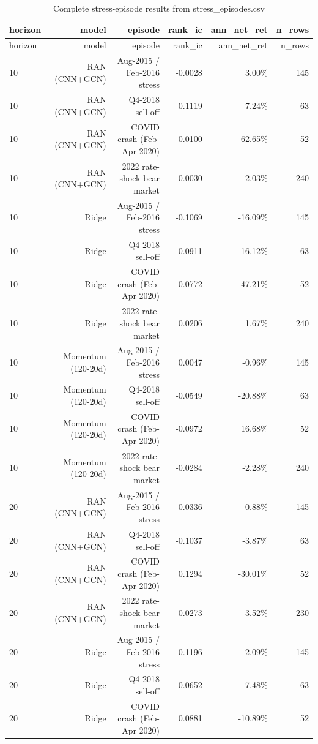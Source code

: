 \documentclass[10pt]{article}
\begin{document}
\begingroup\scriptsize\setlength{\tabcolsep}{3pt}
\begin{longtable}{lrrrrr}
\caption{Complete stress-episode results from stress\_episodes.csv}\label{tab:stressall}\\
\toprule
horizon & model & episode & rank\_ic & ann\_net\_ret & n\_rows \\
\midrule
\endfirsthead
\toprule
horizon & model & episode & rank\_ic & ann\_net\_ret & n\_rows \\
\midrule
\endhead
10 & RAN (CNN+GCN) & Aug-2015 / Feb-2016 stress & -0.0028 & 3.00\% & 145 \\
10 & RAN (CNN+GCN) & Q4-2018 sell-off & -0.1119 & -7.24\% & 63 \\
10 & RAN (CNN+GCN) & COVID crash (Feb-Apr 2020) & -0.0100 & -62.65\% & 52 \\
10 & RAN (CNN+GCN) & 2022 rate-shock bear market & -0.0030 & 2.03\% & 240 \\
10 & Ridge & Aug-2015 / Feb-2016 stress & -0.1069 & -16.09\% & 145 \\
10 & Ridge & Q4-2018 sell-off & -0.0911 & -16.12\% & 63 \\
10 & Ridge & COVID crash (Feb-Apr 2020) & -0.0772 & -47.21\% & 52 \\
10 & Ridge & 2022 rate-shock bear market & 0.0206 & 1.67\% & 240 \\
10 & Momentum (120-20d) & Aug-2015 / Feb-2016 stress & 0.0047 & -0.96\% & 145 \\
10 & Momentum (120-20d) & Q4-2018 sell-off & -0.0549 & -20.88\% & 63 \\
10 & Momentum (120-20d) & COVID crash (Feb-Apr 2020) & -0.0972 & 16.68\% & 52 \\
10 & Momentum (120-20d) & 2022 rate-shock bear market & -0.0284 & -2.28\% & 240 \\
20 & RAN (CNN+GCN) & Aug-2015 / Feb-2016 stress & -0.0336 & 0.88\% & 145 \\
20 & RAN (CNN+GCN) & Q4-2018 sell-off & -0.1037 & -3.87\% & 63 \\
20 & RAN (CNN+GCN) & COVID crash (Feb-Apr 2020) & 0.1294 & -30.01\% & 52 \\
20 & RAN (CNN+GCN) & 2022 rate-shock bear market & -0.0273 & -3.52\% & 230 \\
20 & Ridge & Aug-2015 / Feb-2016 stress & -0.1196 & -2.09\% & 145 \\
20 & Ridge & Q4-2018 sell-off & -0.0652 & -7.48\% & 63 \\
20 & Ridge & COVID crash (Feb-Apr 2020) & 0.0881 & -10.89\% & 52 \\

\end{longtable}
\end{document}

